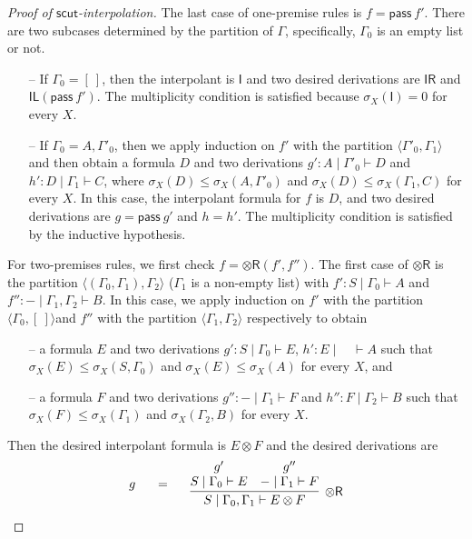 \documentclass[sn-mathphys-num]{sn-jnl}%
\newcommand{\GG}{\Gamma}
\newcommand{\vd}{\vdash}
\newcommand{\tr}{\otimes\mathsf{R}}
\newcommand{\pass}{\mathsf{pass}}
\newcommand{\unitl}{\mathsf{IL}}
\newcommand{\unitr}{\mathsf{IR}}
\newcommand{\ot}{\otimes}
\newcommand{\I}{\mathsf{I}}
\newcommand{\mf}[1]{\mathsf{#1}}
\newcommand{\gs}[1]{\sigma_{X} (#1)}
\theoremstyle{thmstyleone}%
\theoremstyle{thmstyletwo}%
\theoremstyle{thmstylethree}%
\begin{document}
\begin{proof}[Proof of $\mf{scut}$-interpolation]
The last case of one-premise rules is $ f = \pass \ f'$.
There are two subcases determined by the partition of $\GG$, specifically, $\GG_0$ is an empty list or not.
\begin{itemize}
  \item[--] If $\GG_0 = [\ ]$, then the interpolant is $\I$ and two desired derivations are $\unitr$ and $\unitl (\pass \ f')$.
The multiplicity condition is satisfied because $\gs{\I} = 0$ for every $X$.
  \item[--] If $\GG_0 = A, \GG'_0$, then we apply induction on $f'$ with the partition $\langle \GG'_0, \GG_1 \rangle$ and then obtain a formula $D$ and two derivations $g' : A \mid \GG'_0 \vd D$ and $h' : D \mid \GG_1 \vd C$, where $\gs{D} \leq \gs{A, \GG'_0} $ and $ \gs{D} \leq \gs{\GG_1, C}$ for every $X$.
In this case, the interpolant formula for $f$ is $D$, and two desired derivations are $g = \pass \ g'$ and $h = h'$.
The multiplicity condition is satisfied by the inductive hypothesis.
\end{itemize} 
For two-premises rules, we first check $f = \tr (f',f'')$.
The first case of $\tr$ is the partition $\langle (\GG_0, \GG_1), \GG_2 \rangle$ ($\GG_1$ is a non-empty list) with $f' : S \mid \GG_0 \vd A$ and $f'': {-} \mid \GG_1, \GG_2 \vd B$.
In this case, we apply induction on $f'$ with the partition $\langle \GG_0 , [\ ] \rangle $and $f''$ with the partition $\langle \GG_1 , \GG_2 \rangle$ respectively to obtain
\begin{itemize}
  \item[--] a formula $E$ and two derivations $g' : S \mid \GG_0 \vd E$, $h' : E \mid \quad \vd A$ such that $\gs{E} \leq \gs{S, \GG_0} $ and $ \gs{E} \leq \gs{A}$ for every $X$, and
  \item[--] a formula $F$ and two derivations $g'' : {-} \mid \GG_1 \vd F$ and $h'' : F \mid \GG_2 \vd B$ such that $\gs{F} \leq \gs{\GG_1} $ and $\gs{\GG_2, B}$ for every $X$.
\end{itemize}
Then the desired interpolant formula is $E \ot F$ and the desired derivations are
\begin{displaymath}
  \begin{array}{c}
  \begin{array}{c}
    g
  \end{array}
  \quad
  =
  \quad
  \begin{array}{c}
    \infer[\tr]{S \mid \GG_0 , \GG_1 \vd E \ot F}{
      \deduce{S \mid \GG_0 \vd E}{g'}
      &
      \deduce{{-} \mid \GG_1 \vd F}{g''}
    }
  \end{array}

\end{array}
\end{displaymath}
\end{proof}
\end{document}
